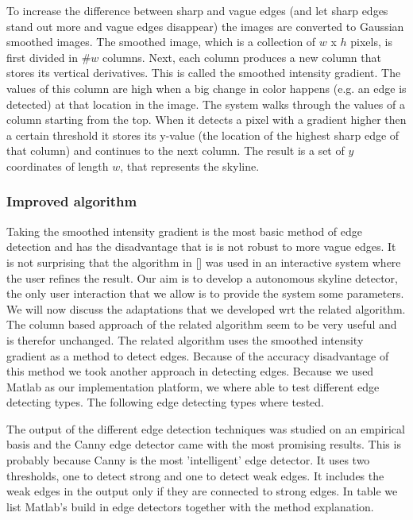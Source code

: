 To increase the difference between sharp and vague edges (and let sharp edges
stand out more and vague edges disappear) the images are converted to Gaussian
smoothed images.  The smoothed image, which is a collection of $w$ x $h$ pixels,
is first divided in \#$w$ columns.  Next, each column produces a new column that
stores its vertical derivatives. This is called the smoothed intensity gradient.
The values of this column are high when a big change in color happens (e.g. an
edge is detected) at that location in the image. 
The system walks through the values of a column starting from the top.  When it
detects a pixel with a gradient higher then a certain threshold it stores its
y-value (the location of the highest sharp edge of that column) and continues
to the next column.  The result is a set of $y$ coordinates of length $w$, that
represents the skyline. 

\subsubsection{Improved algorithm}
Taking the smoothed intensity gradient is the most basic method of edge
detection and has the disadvantage that is is not robust to more vague edges. It
is not surprising that the algorithm in []%
was used in an interactive system
where the user refines the result. 
Our aim is to develop a autonomous skyline detector, the only user interaction
that we allow is to provide the system some parameters. We will now discuss
the adaptations that we developed wrt the related algorithm.\\

The column based approach of the related algorithm seem to be very useful and is
therefor unchanged.  The related algorithm uses the smoothed intensity gradient
as a method to detect edges. 
Because of the accuracy disadvantage of this method we took another approach in
detecting edges. Because we used Matlab as our implementation platform, we where
able to test different edge detecting types. The following edge detecting types
where tested.


The output of the different edge detection techniques was studied on an empirical
basis and the Canny edge detector came with the most promising results. This is
probably because Canny is the most 'intelligent' edge detector.  It uses two
thresholds, one to detect strong and one to detect weak edges. It includes the weak edges in the
output only if they are connected to strong edges. In table %
we list Matlab's build in edge detectors together with the method explanation.

